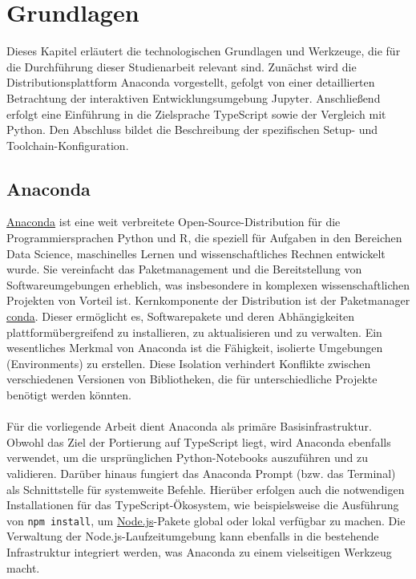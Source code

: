 \section{Grundlagen}
Dieses Kapitel erläutert die technologischen Grundlagen und Werkzeuge, die für die Durchführung dieser Studienarbeit relevant sind. Zunächst wird die Distributionsplattform Anaconda vorgestellt, gefolgt von einer detaillierten Betrachtung der interaktiven Entwicklungsumgebung Jupyter. Anschließend erfolgt eine Einführung in die Zielsprache TypeScript sowie der Vergleich mit Python. Den Abschluss bildet die Beschreibung der spezifischen Setup- und Toolchain-Konfiguration.


\subsection{Anaconda}
\href{https://www.anaconda.com/}{Anaconda} ist eine weit verbreitete Open-Source-Distribution für die Programmiersprachen Python und R, die speziell für Aufgaben in den Bereichen Data Science, maschinelles Lernen und wissenschaftliches Rechnen entwickelt wurde. Sie vereinfacht das Paketmanagement und die Bereitstellung von Softwareumgebungen erheblich, was insbesondere in komplexen wissenschaftlichen Projekten von Vorteil ist. Kernkomponente der Distribution ist der Paketmanager \href{https://anaconda.org/channels/anaconda/packages/conda/overview}{conda}. Dieser ermöglicht es, Softwarepakete und deren Abhängigkeiten plattformübergreifend zu installieren, zu aktualisieren und zu verwalten. Ein wesentliches Merkmal von Anaconda ist die Fähigkeit, isolierte Umgebungen (Environments) zu erstellen. Diese Isolation verhindert Konflikte zwischen verschiedenen Versionen von Bibliotheken, die für unterschiedliche Projekte benötigt werden könnten.\\ \\
Für die vorliegende Arbeit dient Anaconda als primäre Basisinfrastruktur. Obwohl das Ziel der Portierung auf TypeScript liegt, wird Anaconda ebenfalls verwendet, um die ursprünglichen Python-Notebooks auszuführen und zu validieren. Darüber hinaus fungiert das Anaconda Prompt (bzw. das Terminal) als Schnittstelle für systemweite Befehle. Hierüber erfolgen auch die notwendigen Installationen für das TypeScript-Ökosystem, wie beispielsweise die Ausführung von \texttt{npm install}, um \href{https://nodejs.org/en}{Node.js}-Pakete global oder lokal verfügbar zu machen. Die Verwaltung der Node.js-Laufzeitumgebung kann ebenfalls in die bestehende Infrastruktur integriert werden, was Anaconda zu einem vielseitigen Werkzeug macht.


